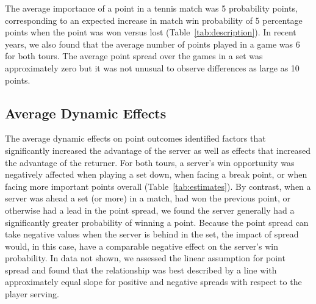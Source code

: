 \documentclass{Latex/svjour3}
\begin{document}
The average importance of a point in a tennis match was 5 probability
points, corresponding to an expected increase in match win probability
of 5 percentage points when the point was won versus lost
(Table~\ref{tab:description}). In recent years, we also found that the average number of points
played in a game was 6 for both tours. The average point spread over
the games in a set was approximately zero but it was not unusual to
observe differences as large as 10 points. 

\subsection{Average Dynamic Effects}

The average dynamic effects on point outcomes identified factors that significantly increased the
advantage of the server as well as effects that increased the
advantage of the returner. For both tours, a server's win opportunity was negatively
affected when playing a set down, when facing a break point, or when
facing more important points overall (Table~\ref{tab:estimates}). By contrast, when a server was ahead a set (or more)
in a match, had won the previous point, or otherwise had a lead in the point
spread, we found the server generally had a significantly greater
probability of winning a point. Because the point spread can take
negative values when the server is behind in the set, the impact of
spread would, in this case, have a comparable negative effect on the
server's win probability. In data not shown, we assessed the linear
assumption for point spread and found that the relationship was best
described by a line with approximately equal slope for positive and
negative spreads with respect to the player serving.
\end{document}

